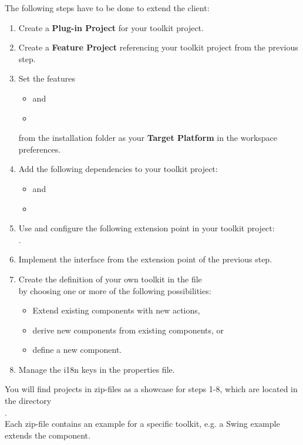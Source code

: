The following steps have to be done to extend the \app{} client:
\begin{enumerate}
 \item Create a \textbf{Plug-in Project} for your toolkit project.
 \item Create a \textbf{Feature Project} referencing your toolkit project from
 the previous step.
 \item Set the features
       \begin{itemize}
        \item {} and
        \item {}
       \end{itemize}
       from the \app{} installation folder \bxshell{\MakeLowercase{\app{}}/} as
       your \textbf{Target Platform} in the workspace preferences.
 \item Add the following dependencies to your toolkit project:
       \begin{itemize}
        \item {} and
        \item {}
       \end{itemize}
 \item Use and configure the following extension point in your toolkit
       project:\\
       .
 \item Implement the interface  from the extension
 point of the previous step.
 \item Create the definition of your own toolkit in the file\\
        by choosing one or more of the following
       possibilities:
       \begin{itemize}
        \item Extend existing \app{} components with new actions,
        \item derive new components from existing \app{} components, or
        \item define a new component.
       \end{itemize}
 \item Manage the i18n keys in the properties file.
\end{enumerate}

You will find projects in zip-files as a showcase for steps 1-8, which are
located in the directory\\
.\\
Each zip-file contains an example for a specific toolkit, e.g. a Swing example
extends the  component.

